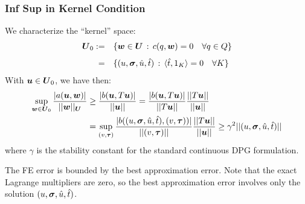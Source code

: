 \documentclass{beamer}
\begin{document}
\begin{frame}
\frametitle{Inf Sup in Kernel Condition}
We characterize the ``kernel'' space:
\begin{equation*}
\begin{array}{rl}
\boldsymbol U_0  := & \{ \boldsymbol w \in \boldsymbol U \, : \, c(q,\boldsymbol w) = 0 \quad \forall q \in Q\} \\[8pt]
 = &\{ (u,\boldsymbol\sigma,\hat{u},\hat{t}) \, : \, \langle \hat{t},1_K \rangle = 0
 \quad \forall K \}
\end{array}
\end{equation*}
With $\boldsymbol u \in \boldsymbol U_0$, we have then:
\begin{align*}
   \sup_{\boldsymbol w \in \boldsymbol U_0} \frac{| a(\boldsymbol u,\boldsymbol w) |}{|| \boldsymbol w ||_{\boldsymbol U} }
   &\geq \frac{| b(\boldsymbol u,T \boldsymbol u) |}{|| \boldsymbol u ||}
   = \frac{| b(\boldsymbol u,T \boldsymbol u) |}{|| T\boldsymbol u ||}\frac{||T\boldsymbol u||}{||\boldsymbol u||}\\
   &= \sup_{(v,\boldsymbol\tau)}\frac{| b((u,\boldsymbol\sigma,\hat{u},\hat{t}), (v,\boldsymbol\tau)) |}{|| (v,\boldsymbol\tau) ||}
   \frac{||T\boldsymbol u||}{||\boldsymbol u||}
   \geq \gamma^2 || (u,\boldsymbol\sigma,\hat{u},\hat{t}) ||
\end{align*}
where $\gamma$ is the stability constant for the standard continuous DPG formulation.

The FE error is bounded by the best approximation error. Note that the exact
Lagrange multipliers are zero, so the best approximation error involves only
the solution $(u,\boldsymbol\sigma,\hat{u},\hat{t})$.


\end{frame}

\end{document}
